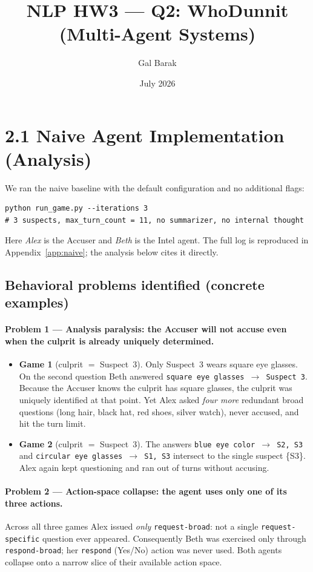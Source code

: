 \documentclass{article}
\title{NLP HW3 --- Q2: WhoDunnit (Multi-Agent Systems)}
\author{Gal Barak}
\date{July 2026}
\begin{document}
\maketitle

\section*{2.1 \quad Naive Agent Implementation (Analysis)}

We ran the naive baseline with the default configuration and no additional flags:
\begin{lstlisting}[style=gamelog]
python run_game.py --iterations 3
# 3 suspects, max_turn_count = 11, no summarizer, no internal thought
\end{lstlisting}
Here \emph{Alex} is the Accuser and \emph{Beth} is the Intel agent. The full log is
reproduced in Appendix~\ref{app:naive}; the analysis below cites it directly.

\subsection*{Behavioral problems identified (concrete examples)}

\paragraph{Problem 1 --- Analysis paralysis: the Accuser will not accuse even when the
culprit is already uniquely determined.}
\begin{itemize}[leftmargin=1.4em]
  \item \textbf{Game 1} (culprit $=$ Suspect~3). Only Suspect~3 wears square eye glasses.
  On the second question Beth answered \texttt{square eye glasses $\rightarrow$ Suspect 3}.
  Because the Accuser knows the culprit has square glasses, the culprit was uniquely
  identified at that point. Yet Alex asked \emph{four more} redundant broad questions
  (long hair, black hat, red shoes, silver watch), never accused, and hit the turn limit.
  \item \textbf{Game 2} (culprit $=$ Suspect~3). The answers
  \texttt{blue eye color $\rightarrow$ S2, S3} and
  \texttt{circular eye glasses $\rightarrow$ S1, S3} intersect to the single suspect
  \{S3\}. Alex again kept questioning and ran out of turns without accusing.
\end{itemize}

\paragraph{Problem 2 --- Action-space collapse: the agent uses only one of its three
actions.} Across all three games Alex issued \emph{only} \texttt{request-broad}: not a
single \texttt{request-specific} question ever appeared. Consequently Beth was exercised
only through \texttt{respond-broad}; her \texttt{respond} (Yes/No) action was never used.
Both agents collapse onto a narrow slice of their available action space.
\end{document}

